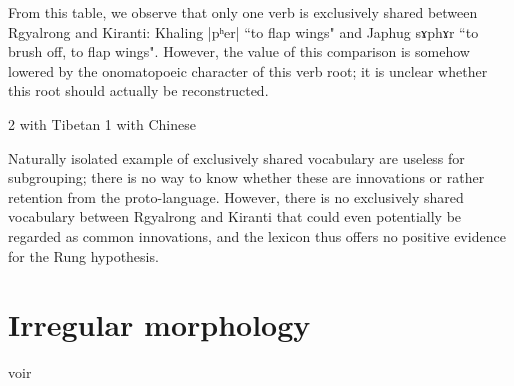 \documentclass[oldfontcommands,oneside,a4paper,11pt]{article}
\newcommand{\ipa}[1]{{\phon #1}} %
\begin{document}
From this table, we observe that only one verb is exclusively shared between Rgyalrong and Kiranti: Khaling |pʰer| ``to flap wings" and Japhug \ipa{sɤphɤr} ``to brush off, to flap wings". However, the value of this comparison is somehow lowered by the 
onomatopoeic character of this verb root; it is unclear whether this root should actually be reconstructed. 

2 with Tibetan
1 with Chinese

Naturally isolated example of exclusively shared vocabulary are useless for subgrouping; there is no way to know whether these are innovations or rather retention from the proto-language. However, there is no exclusively shared vocabulary between Rgyalrong and Kiranti that could even potentially be regarded as common innovations, and the lexicon thus offers no positive evidence for the Rung hypothesis.

\section{Irregular morphology}



 voir \citet{meillet75}  \citet{schindler72apophonie} 




 




\end{document}
